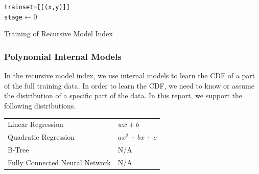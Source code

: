 \begin{algorithm}[H]
    \SetAlgoLined
     \texttt{trainset=[[(x,y)]]} \\
     \texttt{stage$\gets 0$} \\
     \caption{Training of Recursive Model Index}
\end{algorithm}

\subsubsection{Polynomial Internal Models}

In the recursive model index, we use internal models to learn the CDF of a part of the full training data. In order to learn the CDF, we need to know or assume the distribution of a specific part of the data. In this report, we support the following distributions.

\begin{table}[h]
  \begin{tabularx}{\textwidth}{@{}XX@{}}
  \toprule
    Linear Regression & $wx+b$ \\
    Quadratic Regression & $ax^2+bx+c$ \\
    B-Tree & N/A \\
    Fully Connected Neural Network & N/A \\
  \bottomrule
  \end{tabularx}
  \end{table}

